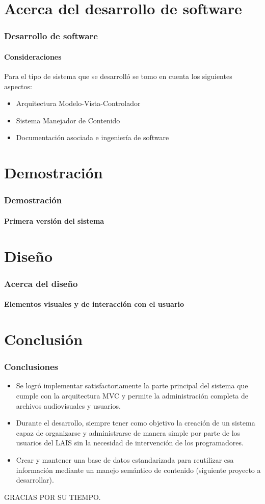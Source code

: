 \documentclass{beamer}
\begin{document}
\section{Acerca del desarrollo de software}
\begin{frame}
	\frametitle{Desarrollo de software}
	\framesubtitle{Consideraciones}
	Para el tipo de sistema que se desarrolló se tomo en cuenta los siguientes aspectos:
	\begin{itemize}
		\item Arquitectura Modelo-Vista-Controlador
		\item Sistema Manejador de Contenido
		\item Documentación asociada e ingeniería de software
	\end{itemize}
\end{frame}

\section{Demostración}
\begin{frame}
	\frametitle{Demostración}
	\framesubtitle{Primera versión del sistema}
	
	
\end{frame}

\section{Diseño}
\begin{frame}
	\frametitle{Acerca del diseño}
	\framesubtitle{Elementos visuales y de interacción con el usuario}
	
	
\end{frame}

\section{Conclusión}
\begin{frame}
	\frametitle{Conclusiones}
	\begin{itemize}
		\item Se logró implementar satisfactoriamente la parte principal del sistema que cumple con la arquitectura MVC y permite la administración completa de archivos audiovisuales y usuarios.
		\item Durante el desarrollo, siempre tener como objetivo la creación de un sistema capaz de organizarse y administrarse de manera simple por parte de los usuarios del LAIS sin la necesidad de intervención de los programadores.
		\item Crear y mantener una base de datos estandarizada para reutilizar esa información mediante un manejo semántico de contenido (siguiente proyecto a desarrollar).
	\end{itemize}
\end{frame}

\begin{frame}
	\begin{center}
		GRACIAS POR SU TIEMPO.
		
	\end{center}
\end{frame}
\end{document}
